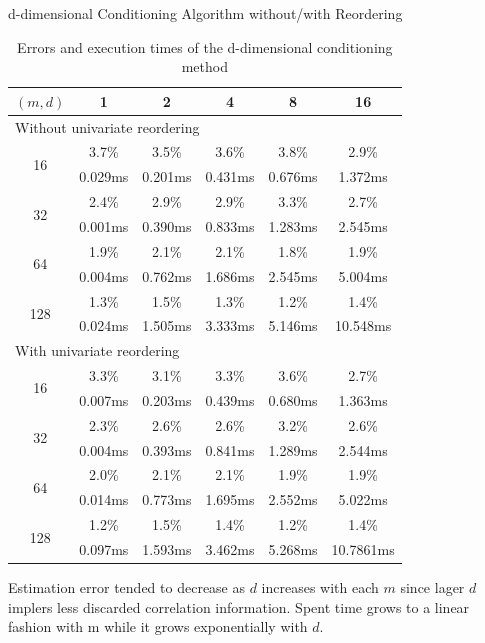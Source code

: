 \begin{frame}{d-dimensional Conditioning Algorithm without/with Reordering}
\tiny

\begin{table}[h]
	\centering
	{
		\begin{tabular}{@{}cccccc@{}}
			\toprule
			$(m, d)$ & 1 & 2 & 4 & 8 & 16 \\ \midrule
			\multicolumn{6}{l}{Without univariate reordering} \\ \midrule
			\multirow{2}{*}{16} & 3.7\% & 3.5\% & 3.6\% & 3.8\% & 2.9\% \\
			& 0.029ms & 0.201ms & 0.431ms & 0.676ms & 1.372ms \\
			\multirow{2}{*}{32} & 2.4\% & 2.9\% & 2.9\% & 3.3\% & 2.7\% \\
			& 0.001ms & 0.390ms & 0.833ms & 1.283ms & 2.545ms \\
			\multirow{2}{*}{64} & 1.9\% & 2.1\% & 2.1\% & 1.8\% & 1.9\% \\
			& 0.004ms & 0.762ms & 1.686ms & 2.545ms & 5.004ms \\
			\multirow{2}{*}{128} & 1.3\% & 1.5\% & 1.3\% & 1.2\% & 1.4\% \\
			& 0.024ms & 1.505ms & 3.333ms & 5.146ms & 10.548ms \\ \midrule
			\multicolumn{6}{l}{With univariate reordering} \\ \midrule
			\multirow{2}{*}{16} & 3.3\% & 3.1\% & 3.3\% & 3.6\% & 2.7\% \\
			& 0.007ms & 0.203ms & 0.439ms & 0.680ms & 1.363ms \\
			\multirow{2}{*}{32} & 2.3\% & 2.6\% & 2.6\% & 3.2\% & 2.6\% \\
			& 0.004ms & 0.393ms & 0.841ms & 1.289ms & 2.544ms \\
			\multirow{2}{*}{64} & 2.0\% & 2.1\% & 2.1\% & 1.9\% & 1.9\% \\
			& 0.014ms & 0.773ms & 1.695ms & 2.552ms & 5.022ms \\
			\multirow{2}{*}{128} & 1.2\% & 1.5\% & 1.4\% & 1.2\% & 1.4\% \\
			& 0.097ms & 1.593ms & 3.462ms & 5.268ms & 10.7861ms \\ \bottomrule
		\end{tabular}%
	}
	\caption{Errors and execution times of the d-dimensional conditioning method}
	\label{tab:table2}
\end{table}
\footnotesize
Estimation error tended to decrease as $d$ increases with each $m$ since lager $d$ implers less discarded correlation information. Spent time grows to a linear fashion with m while it grows exponentially with $d$.
\end{frame}